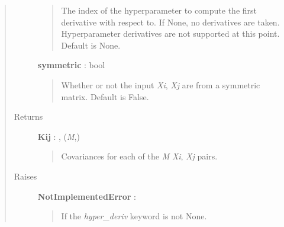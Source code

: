 \documentclass[letterpaper,10pt,english]{sphinxmanual}
\begin{document}
\begin{fulllineitems}
\begin{fulllineitems}
\begin{quote}
\begin{description}
\begin{quote}
The index of the hyperparameter to compute the first derivative
with respect to. If None, no derivatives are taken. Hyperparameter
derivatives are not supported at this point. Default is None.
\end{quote}

\textbf{symmetric} : bool
\begin{quote}

Whether or not the input \emph{Xi}, \emph{Xj} are from a symmetric matrix.
Default is False.
\end{quote}

\item[{Returns }] \leavevmode
\textbf{Kij} : , (\emph{M},)
\begin{quote}

Covariances for each of the \emph{M} \emph{Xi}, \emph{Xj} pairs.
\end{quote}

\item[{Raises }] \leavevmode
\textbf{NotImplementedError} :
\begin{quote}

If the \emph{hyper\_deriv} keyword is not None.
\end{quote}

\end{description}\end{quote}

\end{fulllineitems}


\end{fulllineitems}

\end{document}
